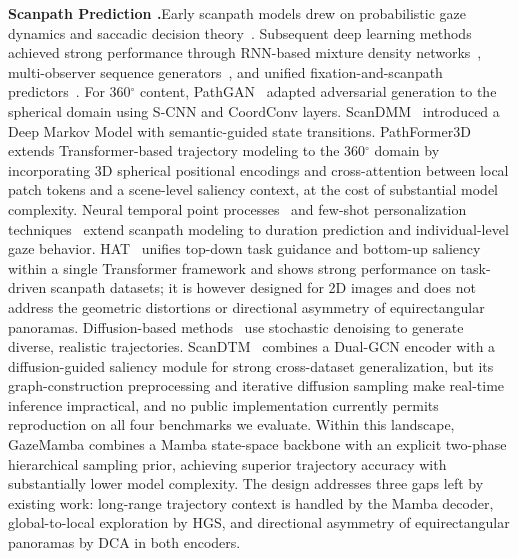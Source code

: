 \documentclass[sigconf]{acmart}
\begin{document}
\noindent\textbf{Scanpath Prediction .}Early scanpath models drew on probabilistic gaze dynamics and saccadic decision theory~\cite{boccignone2004randomwalk}. Subsequent deep learning methods achieved strong performance through RNN-based mixture density networks~\cite{sun2021iorroi,wolfe2021guidedsearch}, multi-observer sequence generators~\cite{debelan2022scanpathnet}, and unified fixation-and-scanpath predictors~\cite{kummerer2022deepgazeIII}. For 360$^\circ$ content, PathGAN~\cite{martin2022scangan} adapted adversarial generation to the spherical domain using S-CNN and CoordConv layers. ScanDMM~\cite{sui2023scandmm} introduced a Deep Markov Model with semantic-guided state transitions. PathFormer3D~\cite{quan2024pathformer3d} extends Transformer-based trajectory modeling to the 360$^\circ$ domain by incorporating 3D spherical positional encodings and cross-attention between local patch tokens and a scene-level saliency context, at the cost of substantial model complexity. Neural temporal point processes~\cite{damelio2024tppgaze} and few-shot personalization techniques~\cite{xue2024fewshot} extend scanpath modeling to duration prediction and individual-level gaze behavior. HAT~\cite{yang2024unify} unifies top-down task guidance and bottom-up saliency within a single Transformer framework and shows strong performance on task-driven scanpath datasets; it is however designed for 2D images and does not address the geometric distortions or directional asymmetry of equirectangular panoramas. Diffusion-based methods~\cite{cartella2025scandiff} use stochastic denoising to generate diverse, realistic trajectories. ScanDTM~\cite{zhu2025scandtm} combines a Dual-GCN encoder with a diffusion-guided saliency module for strong cross-dataset generalization, but its graph-construction preprocessing and iterative diffusion sampling make real-time inference impractical, and no public implementation currently permits reproduction on all four benchmarks we evaluate. Within this landscape, GazeMamba combines a Mamba state-space backbone with an explicit two-phase hierarchical sampling prior, achieving superior trajectory accuracy with substantially lower model complexity. The design addresses three gaps left by existing work: long-range trajectory context is handled by the Mamba decoder, global-to-local exploration by HGS, and directional asymmetry of equirectangular panoramas by DCA in both encoders.
\end{document}
